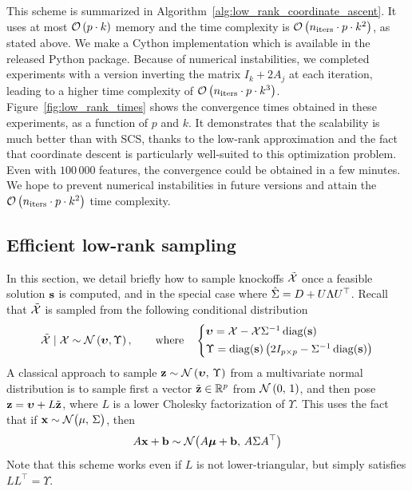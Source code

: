 This scheme is summarized in Algorithm~\ref{alg:low_rank_coordinate_ascent}.
It uses at most $\mathcal{O}\left( p \cdot k \right)$ memory
and the time complexity is $\mathcal{O}\left( n_\text{iters} \cdot p \cdot k^2 \right)$, as stated above.
We make a Cython implementation which is available in the released Python package.
Because of numerical instabilities, we completed experiments with a version inverting the matrix
$I_k + 2A_j$ at each iteration, leading to a higher time complexity of
$\mathcal{O}\left( n_\text{iters} \cdot p \cdot k^3 \right)$.
Figure~\ref{fig:low_rank_times} shows the convergence times obtained in these experiments,
as a function of $p$ and $k$.
It demonstrates that the scalability is much better than with SCS,
thanks to the low-rank approximation and the fact that coordinate descent
is particularly well-suited to this optimization problem.
Even with $100\,000$ features, the convergence could be obtained in a few minutes.
We hope to prevent numerical instabilities in future versions and attain the
$\mathcal{O}\left( n_\text{iters} \cdot p \cdot k^2 \right)$ time complexity.

\subsection{Efficient low-rank sampling}\label{subsec:low_rank_sampling}

In this section, we detail briefly how to sample knockoffs $\tilde{\mathcal{X}}$ once
a feasible solution $\mathbf{s}$ is computed,
and in the special case where $\hat{\Sigma} = D + U\Lambda U^\top$.
Recall that $\tilde{\mathcal{X}}$ is sampled from the following conditional distribution
\begin{equation}\label{eq:conditional_gaussian_knockoffs3}
    \tcX \mid \cX \sim \cN\left( \bupsilon, \Upsilon \right)
    ,\qquad\text{where}\quad
    \begin{cases*}
        \bupsilon = \cX - \cX\Sigma^{-1}\diag(\bs)\\
        \Upsilon = \diag(\bs)\left( 2I_{p \times p} - \Sigma^{-1}\diag(\bs) \right)
    \end{cases*}
\end{equation}
A classical approach to sample
$\mathbf{z} \sim \mathcal{N}\left( \bm{\upsilon},\, \Upsilon \right)$
from a multivariate normal distribution is to sample first a vector
$\tilde{\mathbf{z}} \in \mathbb{R}^p$ from $\mathcal{N}\left( 0,\, 1 \right)$,
and then pose $\mathbf{z} = \bm{\upsilon} + L\tilde{\mathbf{z}}$,
where $L$ is a lower Cholesky factorization of $\Upsilon$.
This uses the fact that if $\mathbf{x} \sim \mathcal{N}\big( \mu,\, \Sigma \big)$,
then
\begin{equation}\label{eq:affine_transformation}
    A\mathbf{x} + \mathbf{b} \sim \mathcal{N}\big( A\bm{\mu} + \mathbf{b},\, A\Sigma A^\top \big)
\end{equation}
Note that this scheme works even if $L$ is not lower-triangular,
but simply satisfies $LL^\top = \Upsilon$.

